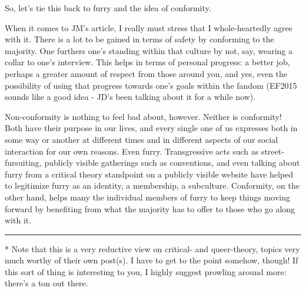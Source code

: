So, let's tie this back to furry and the idea of conformity.

When it comes to JM's article, I really must stress that I
whole-heartedly agree with it. There is a lot to be gained in terms of
safety by conforming to the majority. One furthers one's standing within
that culture by not, say, wearing a collar to one's interview. This
helps in terms of personal progress: a better job, perhaps a greater
amount of respect from those around you, and yes, even the possibility
of using that progress towards one's goals within the fandom (EF2015
sounds like a good idea - JD's been talking about it for a while now).

Non-conformity is nothing to feel bad about, however. Neither is
conformity! Both have their purpose in our lives, and every single one
of us expresses both in some way or another at different times and in
different aspects of our social interaction for our own reasons. Even
furry. Transgressive acts such as street-fursuiting, publicly visible
gatherings such as conventions, and even talking about furry from a
critical theory standpoint on a publicly visible website have helped to
legitimize furry as an identity, a membership, a subculture. Conformity,
on the other hand, helps many the individual members of furry to keep
things moving forward by benefiting from what the majority has to offer
to those who go along with it.

\begin{center}\rule{0.5\linewidth}{\linethickness}\end{center}

* Note that this is a very reductive view on critical- and queer-theory,
topics very much worthy of their own post(s). I have to get to the point
somehow, though! If this sort of thing is interesting to you, I highly
suggest prowling around more: there's a ton out there.
